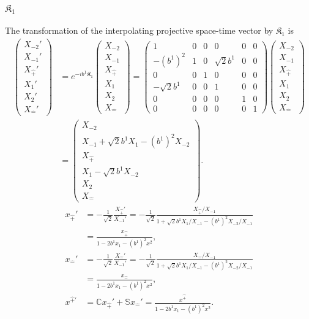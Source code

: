 \documentclass[foundations,article,submit,pdftex,moreauthors]{Definitions/mdpi}
\begin{document}
\subsubsection{\texorpdfstring{$\mathfrak{K}_{1}$}{K1}}

The transformation of the interpolating projective space-time vector by
$\mathfrak{K}_1$ is
\begin{align}
\begin{pmatrix}
X_{-2}'\\ X_{-1}'\\ X_{\hat{+}}'\\ X_1'\\ X_2'\\ X_{\hat{-}}'
\end{pmatrix}
&=e^{-ib^1\mathfrak{K}_1}
\begin{pmatrix}
X_{-2}\\ X_{-1}\\ X_{\hat{+}}\\ X_1\\ X_2\\ X_{\hat{-}}
\end{pmatrix}
=\begin{pmatrix}
1 & 0 & 0 & 0 & 0 & 0\\
- (b^{1})^{2} & 1 & 0 & \sqrt{2} b^{1} & 0 & 0\\
0 & 0 & 1 & 0 & 0 & 0\\
- \sqrt{2} b^{1} & 0 & 0 & 1 & 0 & 0\\
0 & 0 & 0 & 0 & 1 & 0\\
0 & 0 & 0 & 0 & 0 & 1
\end{pmatrix}
\begin{pmatrix}
X_{-2}\\ X_{-1}\\ X_{\hat{+}}\\ X_1\\ X_2\\ X_{\hat{-}}
\end{pmatrix}\\
&=\begin{pmatrix}
X_{-2}\\
X_{-1}+\sqrt{2}b^1X_1-(b^1)^2X_{-2}\\
X_{\hat{+}}\\
X_1-\sqrt{2}b^1X_{-2}\\
X_2\\
X_{\hat{-}}
\end{pmatrix}.
\end{align}
\begin{align}
x_{\hat{+}}'
&=-\frac{1}{\sqrt{2}}\frac{X_{\hat{+}}'}{X_{-1}'}
=-\frac{1}{\sqrt{2}}
\frac{X_{\hat{+}}/X_{-1}}
{1+\sqrt{2}b^1X_1/X_{-1}-(b^1)^2X_{-2}/X_{-1}}\nonumber\\
&=\frac{x_{\hat{+}}}{1-2b^1x_1-(b^1)^2x^2}, \nonumber\\
x_{\hat{-}}'
&=-\frac{1}{\sqrt{2}}\frac{X_{\hat{-}}'}{X_{-1}'}
=-\frac{1}{\sqrt{2}}
\frac{X_{\hat{-}}/X_{-1}}
{1+\sqrt{2}b^1X_1/X_{-1}-(b^1)^2X_{-2}/X_{-1}}\nonumber\\
&=\frac{x_{\hat{-}}}{1-2b^1x_1-(b^1)^2x^2}, \nonumber\\
x^{\hat{+}\prime}
&=\mathbb{C}x_{\hat{+}}'+\mathbb{S}x_{\hat{-}}'
=\frac{x^{\hat{+}}}{1-2b^1x_1-(b^1)^2x^2}.
\end{align}
\end{document}
